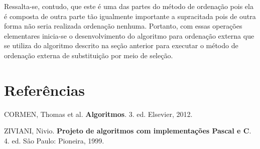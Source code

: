 \documentclass[a4paper, 12pt]{report}
\begin{document}
Ressalta-se, contudo, que este é uma das partes do método de ordenação pois
ela é composta de outra parte tão igualmente importante a supracitada pois
de outra forma não seria realizada ordenação nenhuma. Portanto, com essas
operações elementares inicia-se o desenvolvimento do algoritmo para ordenação
externa que se utiliza do algoritmo descrito na seção anterior para executar
o método de ordenação externa de substituição por meio de seleção.

\part{Referências}
\label{sec-4}

\noindent
CORMEN, Thomas et al. \textbf{Algoritmos}. 3. ed. Elsevier, 2012.

\noindent
ZIVIANI, Nivio. \textbf{Projeto de algoritmos com implementações Pascal e C}. 4. ed.
Sâo Paulo: Pioneira, 1999.
\end{document}
